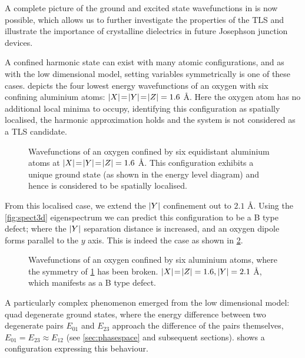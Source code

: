A complete picture of the ground and excited state wavefunctions in  is now possible, which allows us to further investigate the properties of the TLS and illustrate the importance of crystalline dielectrics in future Josephson junction devices.

A confined harmonic state can exist with many atomic configurations, and as with the low dimensional model, setting variables symmetrically is one of these cases.
 depicts the four lowest energy wavefunctions of an oxygen with six confining aluminium atoms: $\lvert X\rvert\!=\!\lvert Y\rvert\!=\!\lvert Z\rvert = 1.6$ \AA.
Here the oxygen atom has no additional local minima to occupy, identifying this configuration as spatially localised, the harmonic approximation holds and the system is not considered as a TLS candidate.

\begin{figure}[htp]
  \resizebox{\textwidth}{!}{}
  \caption[Spatially Localised Configuration]{\label{fig:lineharm}Wavefunctions of an oxygen confined by six equidistant aluminium atoms at $\lvert X\rvert\!=\!\lvert Y\rvert\!=\!\lvert Z\rvert = 1.6$ \AA. This configuration exhibits a unique ground state (as shown in the energy level diagram) and hence is considered to be spatially localised.}
\end{figure}

From this localised case, we extend the $\lvert Y\rvert$ confinement out to $2.1$ \AA.
Using the \cref{fig:spect3d} eigenspectrum we can predict this configuration to be a B type defect; where the $\lvert Y\rvert$ separation distance is increased, and an oxygen dipole forms parallel to the $y$ axis.
This is indeed the case as shown in \cref{fig:lineb}.

\begin{figure}[htp]
  \resizebox{\textwidth}{!}{}
  \caption[B Type Defect Configuration]{\label{fig:lineb}Wavefunctions of an oxygen confined by six aluminium atoms, where the symmetry of \cref{fig:lineharm} has been broken. $\lvert X\rvert\!=\!\lvert Z\rvert = 1.6, \lvert Y\rvert = 2.1$ \AA, which manifests as a B type defect.}
\end{figure}

A particularly complex phenomenon emerged from the low dimensional model: quad degenerate ground states, where the energy difference between two degenerate pairs $E_{01}$ and $E_{23}$ approach the difference of the pairs themselves, \ie $E_{01} = E_{23} \approx E_{12}$ (see \cref{sec:phasespace} and subsequent sections).
 shows a configuration expressing this behaviour.

